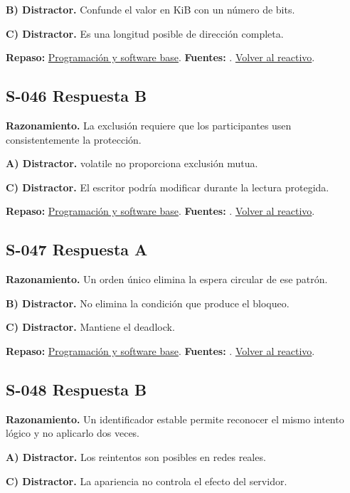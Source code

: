 \textbf{B) Distractor. }Confunde el valor en KiB con un número de bits.

\textbf{C) Distractor. }Es una longitud posible de dirección completa.

\textbf{Repaso:} \hyperref[sec:s2]{Programación y software base}. \textbf{Fuentes:} \cite{ostep,cppreference,compiler}. \hyperref[q:S-045]{Volver al reactivo}.\par\medskip

\subsection*{S-046 \quad Respuesta B}\label{s:S-046}
\textbf{Razonamiento.} La exclusión requiere que los participantes usen consistentemente la protección.

\textbf{A) Distractor. }volatile no proporciona exclusión mutua.

\textbf{C) Distractor. }El escritor podría modificar durante la lectura protegida.

\textbf{Repaso:} \hyperref[sec:s2]{Programación y software base}. \textbf{Fuentes:} \cite{ostep,cppreference,compiler}. \hyperref[q:S-046]{Volver al reactivo}.\par\medskip

\subsection*{S-047 \quad Respuesta A}\label{s:S-047}
\textbf{Razonamiento.} Un orden único elimina la espera circular de ese patrón.

\textbf{B) Distractor. }No elimina la condición que produce el bloqueo.

\textbf{C) Distractor. }Mantiene el deadlock.

\textbf{Repaso:} \hyperref[sec:s2]{Programación y software base}. \textbf{Fuentes:} \cite{ostep,cppreference,compiler}. \hyperref[q:S-047]{Volver al reactivo}.\par\medskip

\subsection*{S-048 \quad Respuesta B}\label{s:S-048}
\textbf{Razonamiento.} Un identificador estable permite reconocer el mismo intento lógico y no aplicarlo dos veces.

\textbf{A) Distractor. }Los reintentos son posibles en redes reales.

\textbf{C) Distractor. }La apariencia no controla el efecto del servidor.

